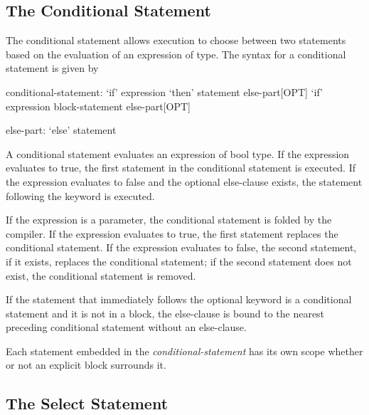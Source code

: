 \subsection{The Conditional Statement}
\label{The_Conditional_Statement}

The conditional statement allows execution to choose between two
statements based on the evaluation of an expression of 
type. The syntax for a conditional statement is given by
\begin{syntax}
conditional-statement:
  `if' expression `then' statement else-part[OPT]
  `if' expression block-statement else-part[OPT]

else-part:
  `else' statement
\end{syntax}

A conditional statement evaluates an expression of bool type. If the
expression evaluates to true, the first statement in the conditional
statement is executed.  If the expression evaluates to false and the
optional else-clause exists, the statement following the
 keyword is executed.

If the expression is a parameter, the conditional statement is folded
by the compiler. If the expression evaluates to true, the first
statement replaces the conditional statement. If the expression
evaluates to false, the second statement, if it exists, replaces the
conditional statement; if the second statement does not exist, the
conditional statement is removed.

If the statement that immediately follows the optional 
keyword is a conditional statement and it is not in a block, the
else-clause is bound to the nearest preceding conditional statement
without an else-clause.

Each statement embedded in the {\em conditional-statement} has its own
scope whether or not an explicit block surrounds it.

\subsection{The Select Statement}
\label{The_Select_Statement}


